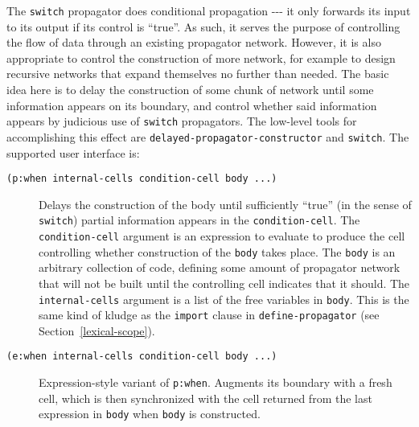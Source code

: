 \documentclass[12pt,letterpaper,english]{article}
\begin{document}
The \texttt{switch} propagator does conditional propagation -{}-{}- it only
forwards its input to its output if its control is ``true''.  As such,
it serves the purpose of controlling the flow of data through an existing
propagator network.  However, it is also appropriate to control the
construction of more network, for example to design recursive networks
that expand themselves no further than needed.  The basic idea here
is to delay the construction of some chunk of network until
some information appears on its boundary, and control whether
said information appears by judicious use of \texttt{switch} propagators.  The
low-level tools for accomplishing this effect are
\texttt{delayed-propagator-constructor} and \texttt{switch}.  The supported
user interface is:
\begin{description}
\item[{\texttt{(p:when internal-cells condition-cell body ...)}}] \leavevmode 
Delays the construction of the body until sufficiently ``true'' (in
the sense of \texttt{switch}) partial information appears in the
\texttt{condition-cell}.  The \texttt{condition-cell} argument is an
expression to evaluate to produce the cell controlling whether
construction of the \texttt{body} takes place.  The \texttt{body} is an
arbitrary collection of code, defining some amount of propagator
network that will not be built until the controlling cell indicates
that it should.  The \texttt{internal-cells} argument is a list of the
free variables in \texttt{body}.  This is the same kind of kludge as the
\texttt{import} clause in \texttt{define-propagator} (see Section~\ref{lexical-scope}).

\item[{\texttt{(e:when internal-cells condition-cell body ...)}}] \leavevmode 
Expression-style variant of \texttt{p:when}.  Augments its boundary with
a fresh cell, which is then synchronized with the cell returned from
the last expression in \texttt{body} when \texttt{body} is constructed.

\end{description}
\end{document}
